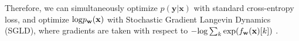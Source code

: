 \documentclass[a4paper,conference]{IEEEtran}
\theoremstyle{plain}%
\begin{document}
Therefore, we can simultaneously optimize $p(\mathbf{y}|\mathbf{x})$ with standard cross-entropy loss, and optimize ${\rm log}p_{\mathbf{w}}(\mathbf{x})$ with Stochastic Gradient Langevin Dynamics (SGLD), where gradients are taken with respect to $-{\rm log}\sum_k{\rm exp}{(f_{\mathbf{w}}({\mathbf{x}})[k])}$ \cite{grathwohl2019your}. 





 

 
\end{document}
